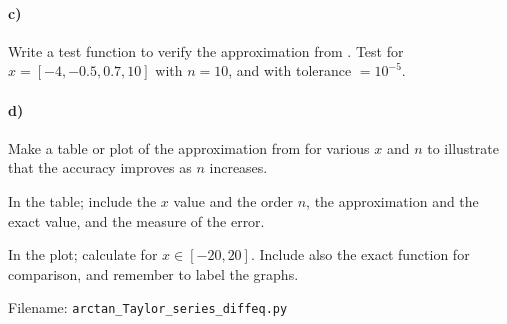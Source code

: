\begin{Problem}
\paragraph{c)}
Write a test function to verify the approximation from . Test for $x=[-4, -0.5, 0.7, 10]$ with $n=10$, and with tolerance $=10^{-5}$.

\paragraph{d)}
Make a table or plot of the approximation from  for various $x$ and $n$ to illustrate that the accuracy improves as $n$ increases.


In the table; include the $x$ value and the order $n$, the approximation and the exact value, and the measure of the error.


In the plot; calculate for $x\in[-20, 20]$. Include also the exact function for comparison, and remember to label the graphs.



Filename: \texttt{arctan\_Taylor\_series\_diffeq.py}
\end{Problem}